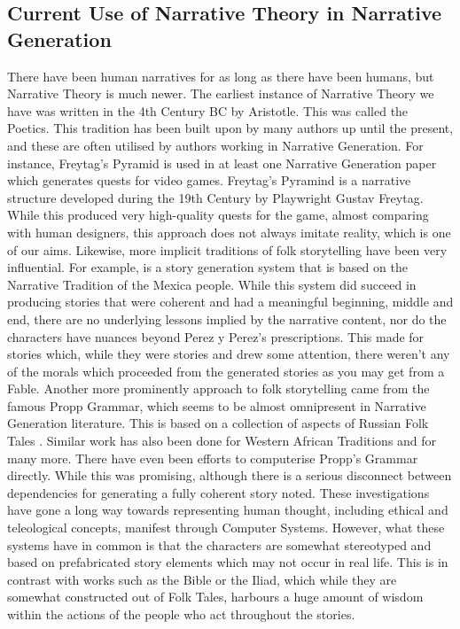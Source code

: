 \documentclass[11pt]{article}
\begin{document}
\subsection{Current Use of Narrative Theory in Narrative Generation}
There have been human narratives for as long as there have been humans, but Narrative Theory is much newer. The earliest instance of Narrative Theory we have was written in the 4th Century BC by Aristotle. This was called the Poetics. This tradition has been built upon by many authors up until the present, and these are often utilised by authors working in Narrative Generation.  For instance, Freytag's Pyramid is used in at least one Narrative Generation paper which generates quests for video games\cite{questgeneration}.  Freytag's Pyramind is a narrative structure developed during the 19th Century by Playwright Gustav Freytag. While this produced very high-quality quests for the game, almost comparing with human designers, this approach does not always imitate reality, which is one of our aims. Likewise, more implicit traditions of folk storytelling have been very influential. For example, \cite{MEXICA} is a story generation system that is based on the Narrative Tradition of the Mexica people. While this system did succeed in producing stories that were coherent and had a meaningful beginning, middle and end, there are no underlying lessons implied by the narrative content, nor do the characters have nuances beyond Perez y Perez's prescriptions. This made for stories which, while they were stories and drew some attention, there weren't any of the morals which proceeded from the generated stories as you may get from a Fable. Another more prominently approach to folk storytelling came from the famous Propp Grammar, which seems to be almost omnipresent in Narrative Generation literature. This is based on a collection of aspects of Russian Folk Tales \cite{propp1975morphology}. Similar work has also been done for Western African Traditions \cite{WestAfricanGeneration} and for many more.  There have even been efforts to computerise Propp's Grammar directly\cite{Gervs2013ProppsMO}. While this was promising, although there is a serious disconnect between dependencies for generating a fully coherent story noted. These investigations have gone a long way towards representing human thought, including ethical and teleological concepts, manifest through Computer Systems. However, what these systems have in common is that the characters are somewhat stereotyped and based on prefabricated story elements which may not occur in real life. This is in contrast with works such as the Bible or the Iliad, which while they are somewhat constructed out of Folk Tales, harbours a huge amount of wisdom within the actions of the people who act throughout the stories.\\
\end{document}
